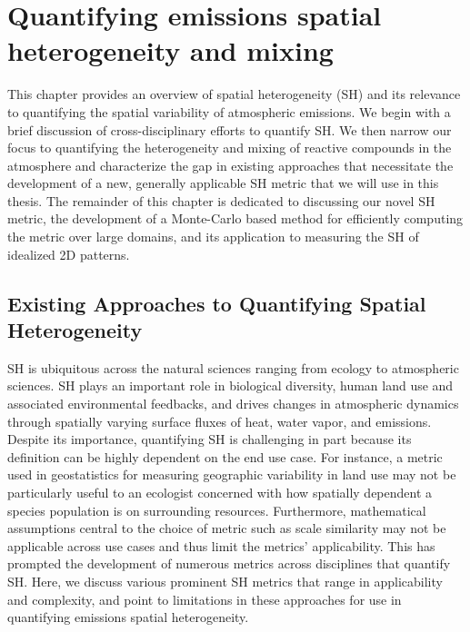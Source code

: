 \chapter{Quantifying emissions spatial heterogeneity and mixing}

This chapter provides an overview of spatial heterogeneity (SH) and its relevance to quantifying the spatial variability of atmospheric emissions. We begin with a brief discussion of cross-disciplinary efforts to quantify SH. We then narrow our focus to quantifying the heterogeneity and mixing of reactive compounds in the atmosphere and characterize the gap in existing approaches that necessitate the development of a new, generally applicable SH metric that we will use in this thesis. The remainder of this chapter is dedicated to discussing our novel SH metric, the development of a Monte-Carlo based method for efficiently computing the metric over large domains, and its application to measuring the SH of idealized 2D patterns.  

\section{Existing Approaches to Quantifying Spatial Heterogeneity}\label{existing-sh-metrics}
SH is ubiquitous across the natural sciences ranging from ecology to atmospheric sciences. SH plays an important role in biological diversity, human land use and associated environmental feedbacks, and drives changes in atmospheric dynamics through spatially varying surface fluxes of heat, water vapor, and emissions. Despite its importance, quantifying SH is challenging in part because its definition can be highly dependent on the end use case. For instance, a metric used in geostatistics for measuring geographic variability in land use may not be particularly useful to an ecologist concerned with how spatially dependent a species population is on surrounding resources. Furthermore, mathematical assumptions central to the choice of metric such as scale similarity may not be applicable across use cases and thus limit the metrics' applicability. This has prompted the development of numerous metrics across disciplines that quantify SH. Here, we discuss various prominent SH metrics that range in applicability and complexity, and point to limitations in these approaches for use in quantifying emissions spatial heterogeneity. 

